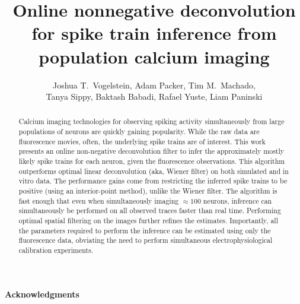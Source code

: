  
\usepackage{multicol}
\usepackage{hyperref}
\newcommand{\zzz}{z}
\newcommand{\az}{\argmax_{\bM \bC \geq \ve{0}}}
\newcommand{\anx}{\argmax_{n_t \in \mathbb{N}_0 \forall t}}
\newcommand{\foopsi}{fast }


\title{Online nonnegative deconvolution for spike train inference from population calcium imaging}

\author{Joshua T.~Vogelstein, Adam Packer, Tim M.~Machado, \\ Tanya Sippy, Baktash Babadi, Rafael Yuste, Liam Paninski}



\maketitle
\begin{abstract}
Calcium imaging technologies for observing spiking activity simultaneously from large populations of neurons are quickly gaining popularity.  While the raw data are fluorescence movies, often, the underlying spike trains are of interest.  This work presents an online non-negative deconvolution filter to infer the approximately mostly likely spike trains for each neuron, given the fluorescence observations.  This algorithm outperforms optimal linear deconvolution (aka, Wiener filter) on both simulated and in vitro data.  The performance gains come from restricting the inferred spike trains to be positive (using an interior-point method), unlike the Wiener filter.  The algorithm is fast enough that even when simultaneously imaging $\approx 100$ neurons, inference can simultaneously be performed on all observed traces faster than real time.  Performing optimal spatial filtering on the images further refines the estimates.  Importantly, all the parameters required to perform the inference can be estimated using only the fluorescence data, obviating the need to perform simultaneous electrophysiological calibration experiments.
\end{abstract}



\paragraph{Acknowledgments}

